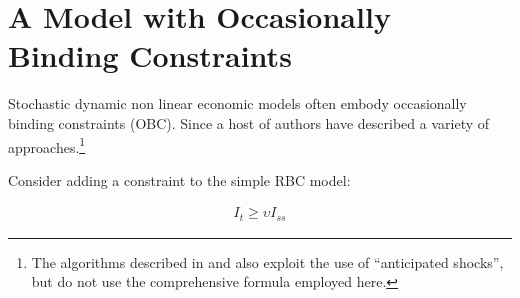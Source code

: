 \documentclass[12pt]{article}
\begin{document}
\clearpage
\section{A Model with Occasionally Binding Constraints}
\label{sec:occbind}



\label{sec:obc-solut}

Stochastic dynamic non linear economic
models often embody  occasionally binding constraints (OBC).
Since  \citep{Christiano2000} a host of
authors have described a variety of approaches.\footnote{The algorithms described in  \citep{holden15:_exist_dsge} and  \citep{guerrieri15:_occbin} also exploit the use of ``anticipated shocks'', but do not use the comprehensive formula employed here. }
 \citep{holden15:_exist_dsge,guerrieri15:_occbin,benigno09,hintermaier10,brumm10,nakov08,haefke98,nakata12,gordon11,billi11,Hintermaier2010,Guerrieri2015}


\label{sec:folag}

Consider adding  a  constraint to the simple RBC model:

\begin{gather*}
  I_t \ge \upsilon I_{ss}
\end{gather*}
\end{document}
